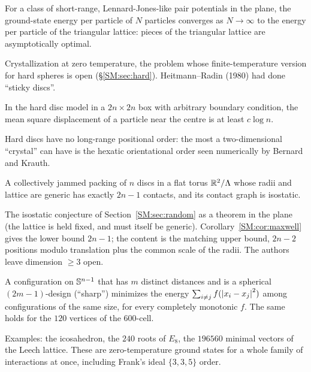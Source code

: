 \begin{theorem}
For a class of short-range, Lennard-Jones-like pair potentials in the plane, the ground-state energy per
particle of $N$ particles converges as $N\to\infty$ to the energy per particle of the triangular lattice:
pieces of the triangular lattice are asymptotically optimal.
\end{theorem}
\noindent Crystallization at zero temperature, the problem whose finite-temperature version for hard
spheres is open (\S\ref{SM:sec:hard}). Heitmann--Radin (1980) had done ``sticky discs''.

\begin{theorem}
In the hard disc model in a $2n\times2n$ box with arbitrary boundary condition, the mean square
displacement of a particle near the centre is at least $c\log n$.
\end{theorem}
\noindent Hard discs have no long-range positional order: the most a two-dimensional ``crystal'' can
have is the hexatic orientational order seen numerically by Bernard and Krauth.

\begin{theorem}
A collectively jammed packing of $n$ discs in a flat torus $\mathbb{R}^2/\Lambda$ whose radii and lattice are
generic has exactly $2n-1$ contacts, and its contact graph is isostatic.
\end{theorem}
\noindent The isostatic conjecture of Section~\ref{SM:sec:random} as a theorem in the plane (the lattice is
held fixed, and must itself be generic). Corollary~\ref{SM:cor:maxwell} gives the lower bound $2n-1$; the
content is the matching upper bound, $2n-2$ positions modulo translation plus the common scale of the
radii. The authors leave dimension $\ge3$ open.

\begin{theorem}
A configuration on $\mathbb{S}^{n-1}$ that has $m$ distinct distances and is a spherical $(2m-1)$-design
(``sharp'') minimizes the energy $\sum_{i\ne j}f(\left\lvert x_i-x_j \right\rvert^2)$ among configurations of the same size,
for every completely monotonic $f$. The same holds for the $120$ vertices of the $600$-cell.
\end{theorem}
\noindent Examples: the icosahedron, the $240$ roots of $E_8$, the $196560$ minimal vectors of the Leech
lattice. These are zero-temperature ground states for a whole family of interactions at once, including
Frank's ideal $\{3,3,5\}$ order.

